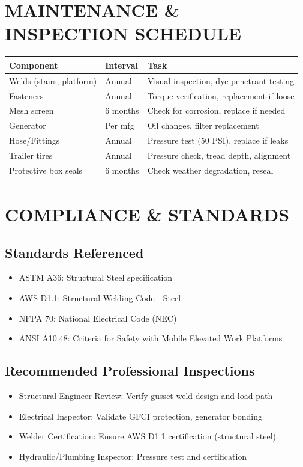 \documentclass[11pt,letter]{article}
\begin{document}
\section{MAINTENANCE \& INSPECTION SCHEDULE}

\begin{tabular}{lll}
\toprule
\textbf{Component} & \textbf{Interval} & \textbf{Task} \\
\midrule
Welds (stairs, platform) & Annual & Visual inspection, dye penetrant testing \\
Fasteners & Annual & Torque verification, replacement if loose \\
Mesh screen & 6 months & Check for corrosion, replace if needed \\
Generator & Per mfg & Oil changes, filter replacement \\
Hose/Fittings & Annual & Pressure test (50 PSI), replace if leaks \\
Trailer tires & Annual & Pressure check, tread depth, alignment \\
Protective box seals & 6 months & Check weather degradation, reseal \\
\bottomrule
\end{tabular}

\section{COMPLIANCE \& STANDARDS}

\subsection{Standards Referenced}
\begin{itemize}
  \item ASTM A36: Structural Steel specification
  \item AWS D1.1: Structural Welding Code - Steel
  \item NFPA 70: National Electrical Code (NEC)
  \item ANSI A10.48: Criteria for Safety with Mobile Elevated Work Platforms
\end{itemize}

\subsection{Recommended Professional Inspections}
\begin{itemize}
  \item Structural Engineer Review: Verify gusset weld design and load path
  \item Electrical Inspector: Validate GFCI protection, generator bonding
  \item Welder Certification: Ensure AWS D1.1 certification (structural steel)
  \item Hydraulic/Plumbing Inspector: Pressure test and certification
\end{itemize}
\end{document}
